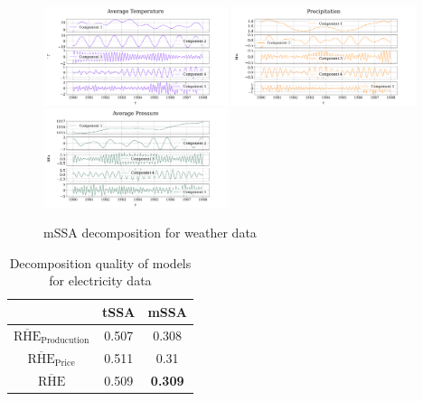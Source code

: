 \documentclass[referee, pdflatex]{sn-jnl}
\theoremstyle{definition}
\theoremstyle{plain}
\begin{document}
	\begin{figure}[h]
		\centering
		\includegraphics[width=0.48\textwidth, keepaspectratio]{../../experiments/weather/mssa/figs/decomposition/manual/grouping_1/Average_Temperature.png}
		\includegraphics[width=0.48\textwidth, keepaspectratio]{../../experiments/weather/mssa/figs/decomposition/manual/grouping_1/Precipitation.png}
		\includegraphics[width=0.48\textwidth, keepaspectratio]{../../experiments/weather/mssa/figs/decomposition/manual/grouping_1/Average_Pressure.png}
		\caption{mSSA decomposition for weather data}\label{fig:weather_decomp_mssa}
	\end{figure}
	
	\def\arraystretch{1.2}
	\begin{table}[h!]
		\centering
		\caption{Decomposition quality of models for electricity data}\label{tab:decomp_electr_results}
		\begin{tabular}{|c|c|c|}
			\hline
			& tSSA  & mSSA           \\ \hline
			$ \overline{\text{RHE}}_{\text{Producution}} $  & 0.507 & 0.308          \\ \hline
			$ \overline{\text{RHE}}_{\text{Price}} $      & 0.511 & 0.31           \\ \hline
			$ \overline{\text{RHE}} $             & 0.509 & \textbf{0.309} \\ \hline
		\end{tabular}
	\end{table}
	
\end{document}
